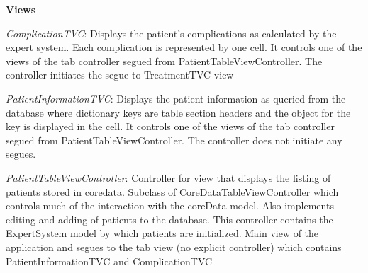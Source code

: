 \documentclass[11pt]{article}
\begin{document}
\textbf{Views}

\emph{ComplicationTVC}:
Displays the patient's complications as calculated by the expert system. Each complication is represented by one cell. It controls one of the views of the tab controller segued from PatientTableViewController. The controller initiates the segue to TreatmentTVC view

\emph{PatientInformationTVC}:
Displays the patient information as queried from the database where dictionary keys are table section headers and the object for the key is displayed in the cell. It controls one of the views of the tab controller segued from PatientTableViewController. The controller does not initiate any segues.

\emph{PatientTableViewController}:
Controller for view that displays the listing of patients stored in coredata. Subclass of CoreDataTableViewController which controls much of the interaction with the coreData model. Also implements editing and adding of patients to the database. This controller contains the ExpertSystem model by which patients are initialized. Main view of the application and segues to the tab view (no explicit controller) which contains PatientInformationTVC and ComplicationTVC

\newpage


\end{document}
